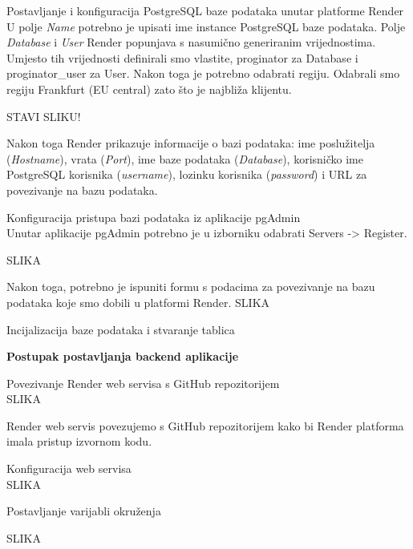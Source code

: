     \begin{packed_item}
		\item Postavljanje i konfiguracija PostgreSQL baze podataka unutar platforme Render \\
		
		U polje \textit{Name} potrebno je upisati ime instance PostgreSQL baze podataka. Polje \textit{Database} i \textit{User} Render popunjava s nasumično generiranim vrijednostima. Umjesto tih vrijednosti definirali smo vlastite, proginator za Database i proginator\_user za User. Nakon toga je potrebno odabrati regiju. Odabrali smo regiju Frankfurt (EU central) zato što je najbliža klijentu. 
		
		STAVI SLIKU!
		
		Nakon toga Render prikazuje informacije o bazi podataka: ime poslužitelja (\textit{Hostname}), vrata (\textit{Port}), ime baze podataka (\textit{Database}), korisničko ime PostgreSQL korisnika (\textit{username}), lozinku korisnika (\textit{password}) i URL za povezivanje na bazu podataka. 
		
		
		\item Konfiguracija pristupa bazi podataka iz aplikacije pgAdmin \\
		Unutar aplikacije pgAdmin potrebno je u izborniku odabrati Servers -> Register.
		
		SLIKA 
		
		Nakon toga, potrebno je ispuniti formu s podacima za povezivanje na bazu podataka koje smo dobili u platformi Render.
		SLIKA
		
		
        \item Incijalizacija baze podataka i stvaranje tablica \\

                   				
	 \end{packed_item}


\textbf{Postupak postavljanja backend aplikacije}

\begin{packed_item}
        \item Povezivanje Render web servisa s GitHub repozitorijem \\
  SLIKA 
        
         Render web servis povezujemo s GitHub repozitorijem kako bi Render platforma imala pristup izvornom kodu.
         
        \item Konfiguracija web servisa \\
        
        SLIKA
        \item Postavljanje varijabli okruženja
        
        SLIKA	
\end{packed_item}

